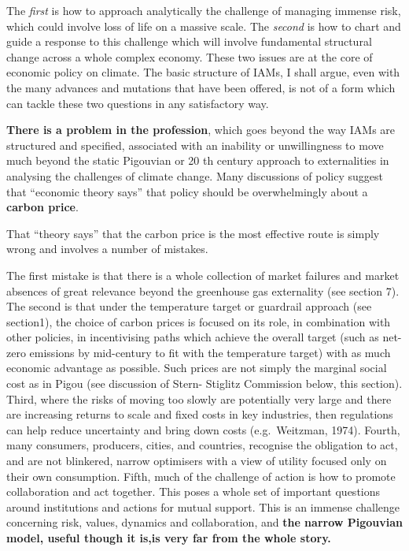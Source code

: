 \documentclass[
]{book}
\begin{document}
The \emph{first} is how to approach analytically the challenge
of managing immense risk, which could involve loss of life on a massive scale. The \emph{second} is how to
chart and guide a response to this challenge which will involve fundamental structural change across a
whole complex economy. These two issues are at the core of economic policy on climate. The basic
structure of IAMs, I shall argue, even with the many advances and mutations that have been offered, is
not of a form which can tackle these two questions in any satisfactory way.

\textbf{There is a problem in the profession}, which goes beyond the way IAMs are structured and specified,
associated with an inability or unwillingness to move much beyond the static Pigouvian or 20 th century
approach to externalities in analysing the challenges of climate change.
Many discussions of policy suggest that ``economic theory says'' that
policy should be overwhelmingly about a \textbf{carbon price}.

That ``theory says'' that the carbon price is the most effective route is simply wrong
and involves a number of mistakes.

The first mistake is that there is a whole collection of market failures and market absences of great
relevance beyond the greenhouse gas externality (see section 7). The second is that under the
temperature target or guardrail approach (see section1), the choice of carbon prices is focused on its
role, in combination with other policies, in incentivising paths which achieve the overall target (such as
net-zero emissions by mid-century to fit with the temperature target) with as much economic advantage
as possible. Such prices are not simply the marginal social cost as in Pigou (see discussion of Stern-
Stiglitz Commission below, this section). Third, where the risks of moving too slowly are potentially very
large and there are increasing returns to scale and fixed costs in key industries, then regulations can
help reduce uncertainty and bring down costs (e.g.~Weitzman, 1974). Fourth, many consumers,
producers, cities, and countries, recognise the obligation to act, and are not blinkered, narrow optimisers
with a view of utility focused only on their own consumption. Fifth, much of the challenge of action is
how to promote collaboration and act together. This poses a whole set of important questions around
institutions and actions for mutual support. This is an immense challenge concerning risk, values,
dynamics and collaboration, and \textbf{the narrow Pigouvian model, useful though it is,is very far from the whole story.}
\end{document}

